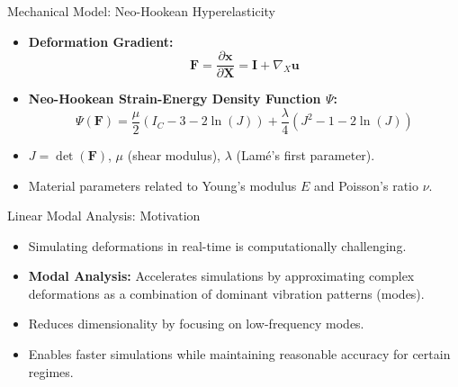 \documentclass{beamer}
\begin{document}
\begin{frame}{Mechanical Model: Neo-Hookean Hyperelasticity}
    \begin{itemize}
        \item \textbf{Deformation Gradient:}
        \begin{equation*}
            \bm{F} = \frac{\partial \bm{x}}{\partial \bm{X}} = \bm{I} + \nabla_X \bm{u}
        \end{equation*}
        \item \textbf{Neo-Hookean Strain-Energy Density Function \(\Psi\):}
        \begin{equation*}
            \Psi(\bm{F}) = \frac{\mu}{2} (I_C - 3 - 2\ln(J)) + \frac{\lambda}{4} (J^2 - 1 - 2\ln(J))
        \end{equation*}
        \item \(J = \det(\bm{F})\), \(\mu\) (shear modulus), \(\lambda\) (Lamé's first parameter).
        \item Material parameters related to Young's modulus \(E\) and Poisson's ratio \(\nu\).
    \end{itemize}
\end{frame}


\begin{frame}{Linear Modal Analysis: Motivation}
    \begin{itemize}
        \item Simulating deformations in real-time is computationally challenging.
        \item \textbf{Modal Analysis:} Accelerates simulations by approximating complex deformations as a combination of dominant vibration patterns (modes).
        \item Reduces dimensionality by focusing on low-frequency modes.
        \item Enables faster simulations while maintaining reasonable accuracy for certain regimes.
    \end{itemize}
\end{frame}
\end{document}
